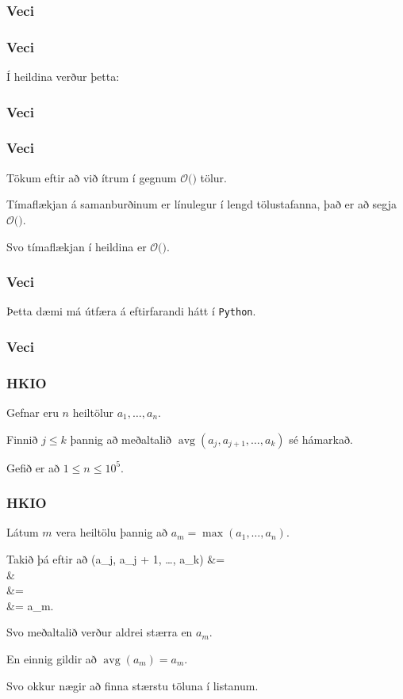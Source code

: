 {
	\frametitle{Veci}
}

{
	\frametitle{Veci}
	{
		\item<1-> Í heildina verður þetta:
	}
}

{
	\frametitle{Veci}
}

{
	\frametitle{Veci}
	{
		\item<1-> Tökum eftir að við ítrum í gegnum $\mathcal{O}($$)$ tölur.
		\item<3-> Tímaflækjan á samanburðinum er línulegur í lengd tölustafanna, það er að segja $\mathcal{O}($\onslide<4->{$\log n$}$)$.
		\item<5-> Svo tímaflækjan í heildina er $\mathcal{O}($\onslide<6->{$n \log n$}$)$.
	}
}

{
	\frametitle{Veci}
	{
		\item<1-> Þetta dæmi má útfæra á eftirfarandi hátt í \texttt{Python}.
	}
}

{
	\frametitle{Veci}
}

{
	\frametitle{HKIO}
	{
		\item<1-> Gefnar eru $n$ heiltölur $a_1, \dots, a_n$.
		\item<2-> Finnið $j \leq k$ þannig að meðaltalið $\operatorname{avg}(a_j, a_{j + 1}, \dots, a_k)$ sé hámarkað.
		\item<3-> Gefið er að $1 \leq n \leq 10^5$.
	}
}

{
	\frametitle{HKIO}
	{
		\item<1-> Látum $m$ vera heiltölu þannig að $a_m = \max(a_1, \dots, a_n)$.
		\item<2-> Takið þá eftir að 
		{
				(a_j, a_{j + 1}, \dots, a_k)
				&= \\
				&\leq {}\\
				&= \\
				&= a_m.
		}
		\item<3-> Svo meðaltalið verður aldrei stærra en $a_m$.
		\item<4-> En einnig gildir að $\operatorname{avg}(a_m) = a_m$.
		\item<5-> Svo okkur nægir að finna stærstu töluna í listanum.
	}
}

